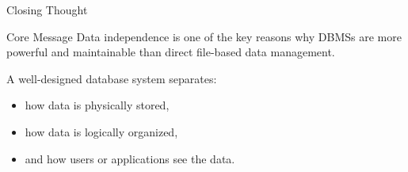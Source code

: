\documentclass[aspectratio=169,11pt]{beamer}
\begin{document}
\begin{frame}{Closing Thought}
\begin{block}{Core Message}
Data independence is one of the key reasons why DBMSs are more powerful and maintainable than direct file-based data management.
\end{block}

\vspace{0.4cm}
A well-designed database system separates:
\begin{itemize}
  \item how data is physically stored,
  \item how data is logically organized,
  \item and how users or applications see the data.
\end{itemize}
\end{frame}
\end{document}

